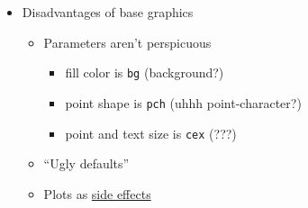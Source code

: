 \documentclass[
]{article}
\providecommand{\tightlist}{%
  \setlength{\itemsep}{0pt}\setlength{\parskip}{0pt}}
\begin{document}
\begin{itemize}
\begin{itemize}
    \begin{itemize}
    \tightlist
    \item
      \texttt{plot(some\_object)} often does something useful

      \begin{itemize}
      \tightlist
      \item
        Try it with dataframes, regression models, principal components results, hierarchical clusterings, igraph networks, \ldots{}
      \end{itemize}
    \item
      \texttt{hist()}, \texttt{pairs()}, \texttt{barplot()}, \texttt{boxplot()}, \texttt{pie()}(!)
    \end{itemize}
  \item
    Straightforward to extend to custom classes
  \item
    No\(^*\) dependencies; works on any\(^*\) R installation
  \item
    Very flexible for unusual visualizations or combinations of plots

    \begin{itemize}
    \tightlist
    \item
      triplots/barycentric coordinates
    \item
      scatterplots with marginal densities
    \item
      heatmaps with marginal dendrograms
    \item
      map with inset plots of local data
    \end{itemize}
  \end{itemize}
\item
  Disadvantages of base graphics

  \begin{itemize}
  \tightlist
  \item
    Parameters aren't perspicuous

    \begin{itemize}
    \tightlist
    \item
      fill color is \texttt{bg} (background?)
    \item
      point shape is \texttt{pch} (uhhh point-character?)
    \item
      point and text size is \texttt{cex} (???)
    \end{itemize}
  \item
    ``Ugly defaults''
  \item
    Plots as \href{https://en.wikipedia.org/wiki/Side_effect_(computer_science)}{side effects}
  \end{itemize}
\end{itemize}
\end{document}
